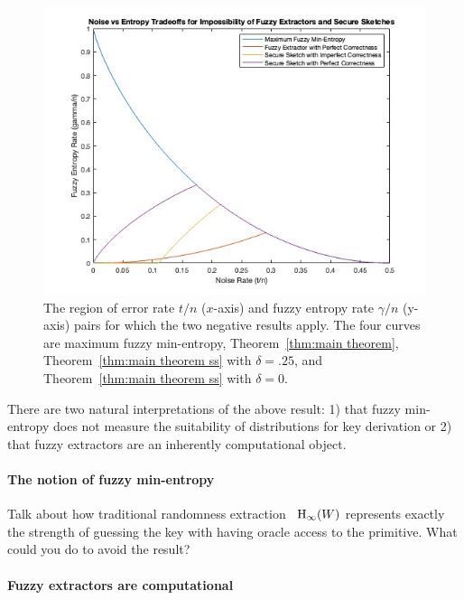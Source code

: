 \begin{figure}[t]
\centering
\includegraphics[width=.8\textwidth]{EntropyvsError.jpg}
\caption{The region of error rate $t/n$ ($x$-axis) and fuzzy entropy rate $\gamma/n$ (y-axis) pairs for which the two negative results apply.  The four curves are maximum fuzzy min-entropy, Theorem~\ref{thm:main theorem}, Theorem~\ref{thm:main theorem ss} with $\delta=.25$, and Theorem~\ref{thm:main theorem ss} with $\delta =0$.}
\label{fig:param regime}
\end{figure}

There are two natural interpretations of the above result: 1) that fuzzy min-entropy does not measure the suitability of distributions for key derivation or 2) that fuzzy extractors are an inherently computational object.

\paragraph{The notion of fuzzy min-entropy}
Talk about how traditional randomness extraction~\cite{nisan1993randomness} $\mathrm{H}_\infty(W)$ represents exactly the strength of guessing the key with having oracle access to the primitive. What could you do to avoid the result?

\paragraph{Fuzzy extractors are computational}

